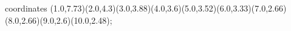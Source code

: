 					coordinates { (1.0,7.73)(2.0,4.3)(3.0,3.88)(4.0,3.6)(5.0,3.52)(6.0,3.33)(7.0,2.66)(8.0,2.66)(9.0,2.6)(10.0,2.48)};